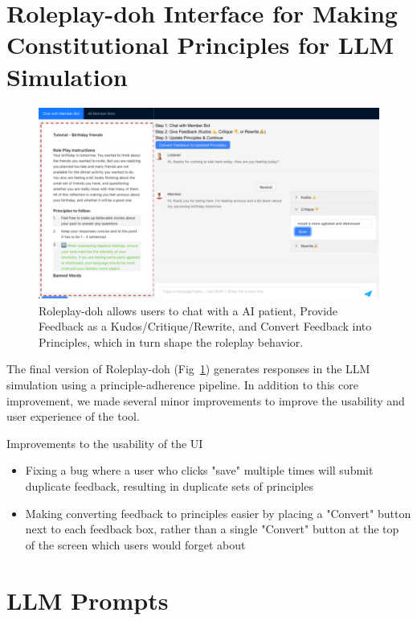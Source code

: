 \documentclass[11pt]{article}
\begin{document}
\section{Roleplay-doh Interface for Making Constitutional Principles for LLM Simulation}
\label{sec:Roleplay-dohv1}
\begin{figure}[t]
    \centering
    \includegraphics[width=\textwidth]{figures/rpd-screenshot.png}
    \caption{Roleplay-doh allows users to chat with a AI patient, Provide Feedback as a Kudos/Critique/Rewrite, and Convert Feedback into Principles, which in turn shape the roleplay behavior.}
    \label{fig:rpd}
\end{figure}

The final version of Roleplay-doh (Fig~\ref{fig:rpd}) generates responses in the LLM simulation using a principle-adherence pipeline. In addition to this core improvement, we made several minor improvements to improve the usability and user experience of the tool. 

Improvements to the usability of the UI
\begin{itemize}
    \item Fixing a bug where a user who clicks "save" multiple times will submit duplicate feedback, resulting in duplicate sets of principles
    \item Making converting feedback to principles easier by placing a "Convert" button next to each feedback box, rather than a single "Convert" button at the top of the screen which users would forget about
\end{itemize}


\section{LLM Prompts}
\label{sec:llmprompts}
\end{document}
